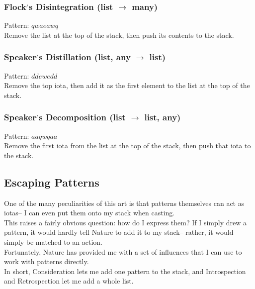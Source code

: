 \documentclass[12pt]{article}
\begin{document}
\subsubsection*{Flock$\rq$s Disintegration (list $\rightarrow$ many)}

    Pattern: $qwaeawq$\\
      Remove the list at the top of the stack, then push its contents to the stack.\\


  \label{sec: patterns/lists@hexcasting:construct}
\subsubsection*{Speaker$\rq$s Distillation (list, any $\rightarrow$ list)}

    Pattern: $ddewedd$\\
      Remove the top iota, then add it as the first element to the list at the top of the stack.\\


  \label{sec: patterns/lists@hexcasting:deconstruct}
\subsubsection*{Speaker$\rq$s Decomposition (list $\rightarrow$ list, any)}

    Pattern: $aaqwqaa$\\
      Remove the first iota from the list at the top of the stack, then push that iota to the stack.\\

\newpage

\label{sec:patterns/patterns_as_iotas}
\subsection*{Escaping Patterns}


  
    One of the many peculiarities of this art is that patterns themselves can act as iotas-- I can even put them onto my stack when casting.\\This raises a fairly obvious question: how do I express them? If I simply drew a pattern, it would hardly tell Nature to add it to my stack-- rather, it would simply be matched to an action.\\


  
    Fortunately, Nature has provided me with a set of influences that I can use to work with patterns directly.\\In short, Consideration lets me add one pattern to the stack, and Introspection and Retrospection let me add a whole list.\\
\end{document}
